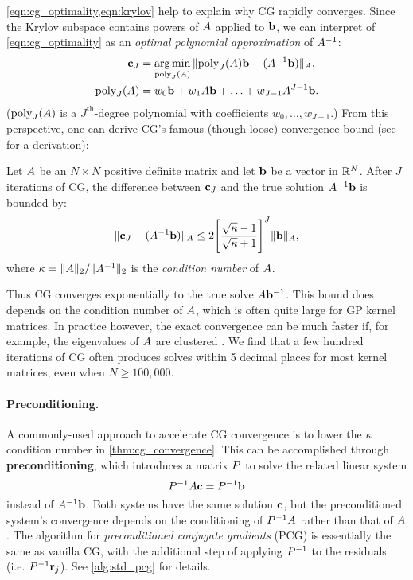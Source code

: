 \cref{eqn:cg_optimality,eqn:krylov} help to explain why CG rapidly converges.
Since the Krylov subspace contains powers of $A$ applied to $\mathbf{b}$, we can interpret of \cref{eqn:cg_optimality} as an \emph{optimal polynomial approximation} of $A^{-1}$:
%
\begin{align*}
  \mathbf{c}_J &= \operatorname*{arg\,min}_{\text{poly}_J(A)} \Vert \text{poly}_J(A)\mathbf{b} - (A^{-1} \mathbf{b}) \Vert_{A},
  \\
  \text{poly}_J(A) &= w_0 \mathbf{b} + w_1 A \mathbf{b} + \ldots + w_{J-1} A^{J-1} \mathbf{b}.
\end{align*}
%
($\text{poly}_J(A)$ is a $J^\text{th}$-degree polynomial with coefficients $w_0, \ldots, w_{J+1}$.)
From this perspective, one can derive CG's famous (though loose) convergence bound (see \citep{shewchuk1994introduction} for a derivation):
%
\begin{theorem}[Convergence of CG]
  \label{thm:cg_convergence}
  Let $A$ be an $N \times N$ positive definite matrix and let $\mathbf{b}$ be a vector in $\mathbb{R}^N$.
  After $J$ iterations of CG, the difference between $\mathbf{c}_J$ and the true solution $A^{-1} \mathbf{b}$ is bounded by:
  \begin{equation*}
    \Vert \mathbf{c}_J - (A^{-1} \mathbf{b}) \Vert_{A}
    \leq
    2 \Bigg[ \frac{ \sqrt \kappa - 1 }{\sqrt \kappa + 1} \Biggr]^J \Vert \mathbf{b} \Vert_{A},
  \end{equation*}
  where $\kappa = \Vert A \Vert_2 / \Vert A^{-1} \Vert_2$ is the \emph{condition number} of $A$.
\end{theorem}
%
Thus CG converges exponentially to the true solve $A \mathbf{b}^{-1}$.
This bound does depends on the condition number of $A$, which is often quite large for GP kernel matrices.
In practice however, the exact convergence can be much faster if, for example, the eigenvalues of $A$ are clustered \cite{saad2003iterative}.
We find that a few hundred iterations of CG often produces solves within 5 decimal places for most kernel matrices, even when $N \geq 100,\!000$.

\paragraph{Preconditioning.}
A commonly-used approach to accelerate CG convergence is to lower the $\kappa$ condition number in \cref{thm:cg_convergence}.
This can be accomplished through {\bf preconditioning}, which introduces a matrix $P$ to solve the related linear system
%
\[
  P^{-1} A \mathbf{c} = P^{-1} \mathbf{b}
\]
%
instead of $A^{-1} \mathbf{b}$.
Both systems have the same solution $\mathbf{c}$, but the preconditioned system's convergence depends on the conditioning of $P^{-1} A$ rather than that of $A$.
The algorithm for \emph{preconditioned conjugate gradients} (PCG) is essentially the same as vanilla CG, with the additional step of applying $P^{-1}$ to the residuals (i.e. $P^{-1} \mathbf{r}_j$).
See \autoref{alg:std_pcg} for details.

